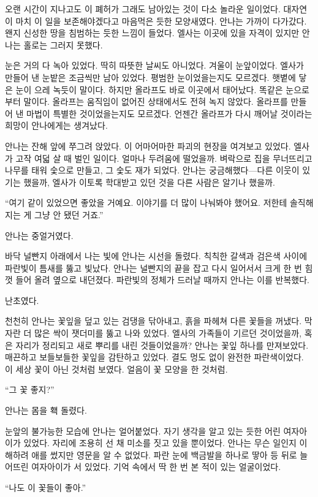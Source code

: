 오랜 시간이 지나고도 이 폐허가 그래도 남아있는 것이 다소 놀라운 일이었다. 대자연이 마치 이 일을 보존해야겠다고 마음먹은 듯한 모양새였다. 안나는 가까이 다가갔다. 왠지 신성한 땅을 침범하는 듯한 느낌이 들었다. 엘사는 이곳에 있을 자격이 있지만 안나는 홀로는 그러지 못했다.

눈은 거의 다 녹아 있었다. 딱히 따뜻한 날씨도 아니었다. 겨울이 눈앞이었다. 엘사가 만들어 낸 눈밭은 조금씩만 남아 있었다. 평범한 눈이었을는지도 모르겠다. 햇볕에 닿은 눈이 으레 녹듯이 말이다. 하지만 올라프도 바로 이곳에서 태어났다. 똑같은 눈으로부터 말이다. 올라프는 움직임이 없어진 상태에서도 전혀 녹지 않았다. 올라프를 만들어 낸 마법이 특별한 것이었을는지도 모르겠다. 언젠간 올라프가 다시 깨어날 것이라는 희망이 안나에게는 생겨났다.

안나는 잔해 앞에 쭈그려 앉았다. 이 어마어마한 파괴의 현장을 여겨보고 있었다. 엘사가 고작 여덟 살 때 벌인 일이다. 얼마나 두려움에 떨었을까. 벼락으로 집을 무너뜨리고 나무를 태워 숯으로 만들고, 그 숯도 재가 되었다. 안나는 궁금해했다—다른 이웃이 있기는 했을까, 엘사가 이토록 학대받고 있던 것을 다른 사람은 알기나 했을까.

``여기 같이 있었으면 좋았을 거예요. 이야기를 더 많이 나눠봐야 했어요. 저한테 솔직해지는 게 그냥 안 됐던 거죠.''

안나는 중얼거였다.

바닥 널빤지 아래에서 나는 빛에 안나는 시선을 돌렸다. 칙칙한 갈색과 검은색 사이에 파란빛이 틈새를 뚫고 빛났다. 안나는 널빤지의 끝을 잡고 다시 일어서서 크게 한 번 힘껏 들어 올려 옆으로 내던졌다. 파란빛의 정체가 드러날 때까지 안나는 이를 반복했다.

난초였다.

천천히 안나는 꽃잎을 덮고 있는 검댕을 닦아내고, 흙을 파헤쳐 다른 꽃들을 꺼냈다. 막 자란 더 많은 싹이 잿더미를 뚫고 나와 있었다. 엘사의 가족들이 기르던 것이었을까, 혹은 자리가 정리되고 새로 뿌리를 내린 것들이었을까? 안나는 꽃잎 하나를 만져보았다. 매끈하고 보들보들한 꽃잎을 감탄하고 있었다. 결도 멍도 없이 완전한 파란색이었다. 이 세상 꽃이 아닌 것처럼 보였다. 얼음이 꽃 모양을 한 것처럼.

``그 꽃 좋지?''

안나는 몸을 홱 돌렸다.

눈앞의 불가능한 모습에 안나는 얼어붙었다. 자기 생각을 알고 있는 듯한 어린 여자아이가 있었다. 자리에 조용히 선 채 미소를 짓고 있을 뿐이었다. 안나는 무슨 일인지 이해하려 애를 썼지만 영문을 알 수 없었다. 파란 눈에 백금발을 하나로 땋아 등 뒤로 늘어뜨린 여자아이가 서 있었다. 기억 속에서 딱 한 번 본 적이 있는 얼굴이었다.

``나도 이 꽃들이 좋아.''

